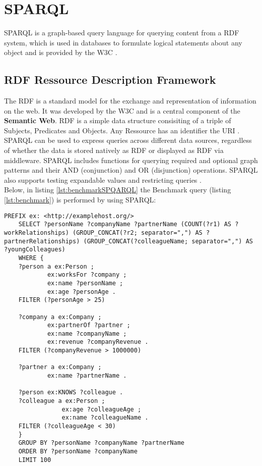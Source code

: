 
\section{SPARQL}
\label{sec:different_query_languages_for_graph_databases:sparql}
SPARQL is a graph-based query language for querying content from a \ac{RDF} system,
which is used in databases to formulate logical statements about any object
and is provided by the \ac{W3C} \citep{sparql_2024}. 

\subsection{RDF Ressource Description Framework}
\label{subsec:different_query_languages_for_graph_databases:sparql:rdf}
The RDF is a standard model 
for the exchange and representation of information on the web. 
It was developed by the W3C and is a central component 
of the \textbf{Semantic Web}.
RDF is a simple data structure consisiting of a triple of Subjects,
Predicates and Objects. 
Any Ressource has an identifier the \ac{URI} \citep{10.1145/3591366.3591376}.\\
SPARQL can be used to express queries across different data sources, 
regardless of whether the data is stored natively as RDF or displayed as RDF via middleware. 
SPARQL includes functions for querying required and optional graph patterns 
and their AND (conjunction) and OR (disjunction) operations. 
SPARQL also supports testing expandable values and restricting queries \citep{sparql_2024}.\\
Below, in listing \ref{lst:benchmarkSPQARQL} the Benchmark query (listing \ref{lst:benchmark}) 
is performed by using SPARQL:
\begin{lstlisting}[caption={Benchmark query in SPARQL}, label={lst:benchmarkSPQARQL}]
	PREFIX ex: <http://examplehost.org/>
	SELECT ?personName ?companyName ?partnerName (COUNT(?r1) AS ?workRelationships) (GROUP_CONCAT(?r2; separator=",") AS ?partnerRelationships) (GROUP_CONCAT(?colleagueName; separator=",") AS ?youngColleagues)
	WHERE {
	?person a ex:Person ;
			ex:worksFor ?company ;
			ex:name ?personName ;
			ex:age ?personAge .
	FILTER (?personAge > 25)

	?company a ex:Company ;
			ex:partnerOf ?partner ;
			ex:name ?companyName ;
			ex:revenue ?companyRevenue .
	FILTER (?companyRevenue > 1000000)

	?partner a ex:Company ;
			ex:name ?partnerName .
	
	?person ex:KNOWS ?colleague .
	?colleague a ex:Person ;
				ex:age ?colleagueAge ;
				ex:name ?colleagueName .
	FILTER (?colleagueAge < 30)
	}
	GROUP BY ?personName ?companyName ?partnerName
	ORDER BY ?personName ?companyName
	LIMIT 100
\end{lstlisting}
